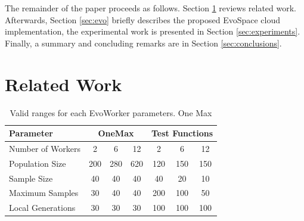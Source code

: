 \documentclass{llncs}
\begin{document}
The remainder of the paper proceeds as follows.  Section \ref{sec:work} 
reviews related work. Afterwards, Section \ref{sec:evo} briefly describes the
proposed EvoSpace cloud implementation, the experimental work is presented in 
Section \ref{sec:experiments}. Finally, a summary and concluding remarks are in
Section \ref{sec:conclusions}.




\section{Related Work}
\label{sec:work}

\begin{table}[!t]
\caption{Valid ranges for each EvoWorker parameters. One Max}
\label{tab:params}
\centering
\begin{tabular}{|l|c|c|c|c|c|c| }
\hline
\textbf{Parameter} & \multicolumn{3}{|c|}{OneMax} & \multicolumn{3}{|c|}{Test Functions} \\
\hline
Number of Workers & 2 & 6 & 12 & 2 & 6 & 12\\
\hline
\hline
Population Size & 200 & 280 & 620 & 120 & 150 & 150\\
\hline
Sample Size & 40 & 40 & 40 & 40 & 20 & 10\\
\hline
Maximum Samples & 30 & 40 & 40 & 200 & 100 & 50\\
\hline
Local Generations & 30 & 30 & 30 & 100 & 100 & 100\\
\hline
\end{tabular}
\end{table}
\end{document}

